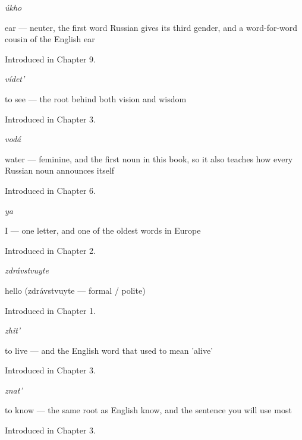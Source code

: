 \noindent\begin{minipage}[t]{\linewidth}
\raggedright
\textbf{}\enspace\emph{úkho}\par
\small ear — neuter, the first word Russian gives its third gender, and a word-for-word cousin of the English ear\par
\footnotesize Introduced in Chapter 9.
\end{minipage}\par\medskip

\noindent\begin{minipage}[t]{\linewidth}
\raggedright
\textbf{}\enspace\emph{vídet'}\par
\small to see — the root behind both vision and wisdom\par
\footnotesize Introduced in Chapter 3.
\end{minipage}\par\medskip

\noindent\begin{minipage}[t]{\linewidth}
\raggedright
\textbf{}\enspace\emph{vodá}\par
\small water — feminine, and the first noun in this book, so it also teaches how every Russian noun announces itself\par
\footnotesize Introduced in Chapter 6.
\end{minipage}\par\medskip

\noindent\begin{minipage}[t]{\linewidth}
\raggedright
\textbf{}\enspace\emph{ya}\par
\small I — one letter, and one of the oldest words in Europe\par
\footnotesize Introduced in Chapter 2.
\end{minipage}\par\medskip

\noindent\begin{minipage}[t]{\linewidth}
\raggedright
\textbf{}\enspace\emph{zdrávstvuyte}\par
\small hello (zdrávstvuyte — formal / polite)\par
\footnotesize Introduced in Chapter 1.
\end{minipage}\par\medskip

\noindent\begin{minipage}[t]{\linewidth}
\raggedright
\textbf{}\enspace\emph{zhit'}\par
\small to live — and the English word that used to mean 'alive'\par
\footnotesize Introduced in Chapter 3.
\end{minipage}\par\medskip

\noindent\begin{minipage}[t]{\linewidth}
\raggedright
\textbf{}\enspace\emph{znat'}\par
\small to know — the same root as English know, and the sentence you will use most\par
\footnotesize Introduced in Chapter 3.
\end{minipage}\par\medskip
